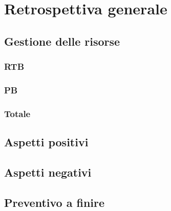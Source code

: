\newpage

\section{Retrospettiva generale}

\subsection{Gestione delle risorse}
\subsubsection{RTB}
\subsubsection{PB}
\subsubsection{Totale}

\subsection{Aspetti positivi}

\subsection{Aspetti negativi}

\subsection{Preventivo a finire}

